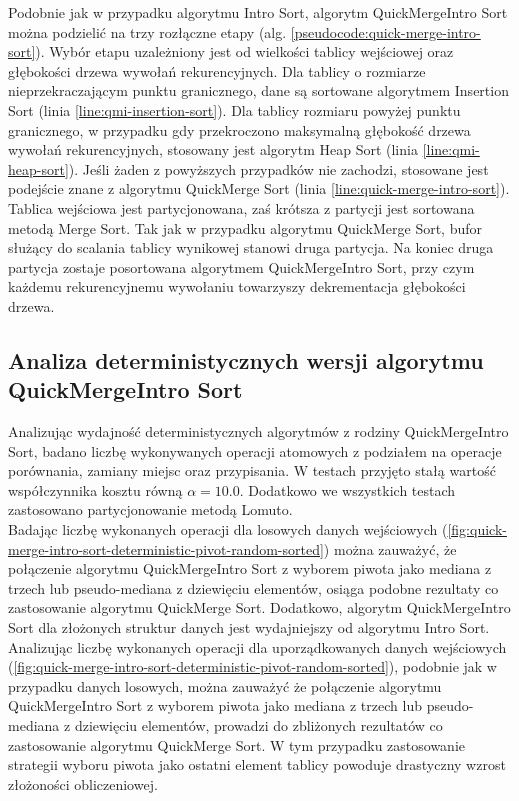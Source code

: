 Podobnie jak w przypadku algorytmu Intro Sort, algorytm QuickMergeIntro Sort można podzielić na trzy rozłączne etapy (alg. \ref{pseudocode:quick-merge-intro-sort}). Wybór etapu uzależniony jest od wielkości tablicy wejściowej oraz głębokości drzewa wywołań rekurencyjnych. Dla tablicy o rozmiarze nieprzekraczającym punktu granicznego, dane są sortowane algorytmem Insertion Sort (linia \ref{line:qmi-insertion-sort}). Dla tablicy rozmiaru powyżej punktu granicznego, w przypadku gdy przekroczono maksymalną głębokość drzewa wywołań rekurencyjnych, stosowany jest algorytm Heap Sort (linia \ref{line:qmi-heap-sort}). Jeśli żaden z powyższych przypadków nie zachodzi, stosowane jest podejście znane z algorytmu QuickMerge Sort (linia \ref{line:quick-merge-intro-sort}). Tablica wejściowa jest partycjonowana, zaś krótsza z partycji jest sortowana metodą Merge Sort. Tak jak w przypadku algorytmu QuickMerge Sort, bufor służący do scalania tablicy wynikowej stanowi druga partycja. Na koniec druga partycja zostaje posortowana algorytmem QuickMergeIntro Sort, przy czym każdemu rekurencyjnemu wywołaniu towarzyszy dekrementacja głębokości drzewa.\\



\subsection{Analiza deterministycznych wersji algorytmu QuickMergeIntro Sort}
Analizując wydajność deterministycznych algorytmów z rodziny QuickMergeIntro Sort, badano liczbę wykonywanych operacji atomowych z podziałem na operacje porównania, zamiany miejsc oraz przypisania. W testach przyjęto stałą wartość współczynnika kosztu równą $\alpha = 10.0$. Dodatkowo we wszystkich testach zastosowano partycjonowanie metodą Lomuto.\\

Badając liczbę wykonanych operacji dla losowych danych wejściowych (\ref{fig:quick-merge-intro-sort-deterministic-pivot-random-sorted}) można zauważyć, że połączenie algorytmu QuickMergeIntro Sort z wyborem piwota jako mediana z trzech lub pseudo-mediana z dziewięciu elementów, osiąga podobne rezultaty co zastosowanie algorytmu QuickMerge Sort. Dodatkowo, algorytm QuickMergeIntro Sort dla złożonych struktur danych jest wydajniejszy od algorytmu Intro Sort.\\

Analizując liczbę wykonanych operacji dla uporządkowanych danych wejściowych (\ref{fig:quick-merge-intro-sort-deterministic-pivot-random-sorted}), podobnie jak w przypadku danych losowych, można zauważyć że połączenie algorytmu QuickMergeIntro Sort z wyborem piwota jako mediana z trzech lub pseudo-mediana z dziewięciu elementów, prowadzi do zbliżonych rezultatów co zastosowanie algorytmu QuickMerge Sort. W tym przypadku zastosowanie strategii wyboru piwota jako ostatni element tablicy powoduje drastyczny wzrost złożoności obliczeniowej.\\

